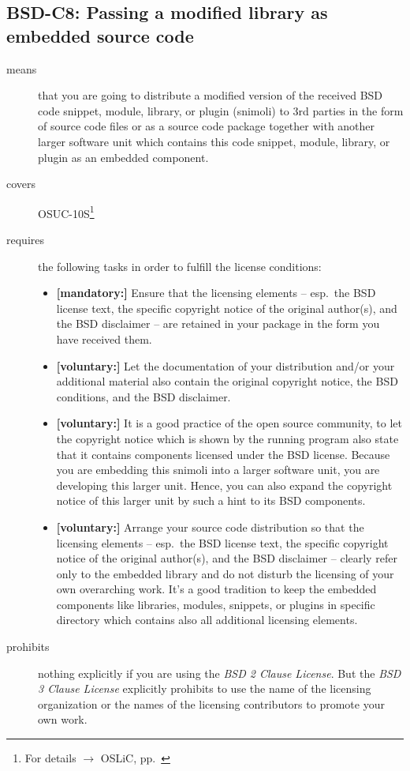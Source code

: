 \subsection{BSD-C8: Passing a modified library as embedded source code}
\label{OSUC-10S-BSD}
\begin{description}
\item[means] that you are going to distribute a modified version of the received
BSD code snippet, module, library, or plugin (snimoli) to 3rd parties in the
form of source code files or as a source code package together with another
larger software unit which contains this code snippet, module, library, or
plugin as an embedded component.
\item[covers] OSUC-10S\footnote{For details $\rightarrow$ OSLiC, pp.\
\pageref{OSUC-10S-DEF}}
\item[requires] the following tasks in order to fulfill the license conditions:
\begin{itemize}
  \item \textbf{[mandatory:]} Ensure that the licensing elements -- esp.\ the
  BSD license text, the specific copyright notice of the original author(s), and
  the BSD disclaimer -- are retained in your package in the form you have
  received them.
  \item \textbf{[voluntary:]} Let the documentation of your distribution
  and/or your additional material also contain the original copyright notice, the
  BSD conditions, and the BSD disclaimer.
 \item \textbf{[voluntary:]} It is a good practice of the open source
  community, to let the copyright notice which is shown by the running program
  also state that it contains components licensed under the BSD license. Because
  you are embedding this snimoli into a larger software unit, you are
  developing this larger unit. Hence, you can also expand the copyright notice
  of this larger unit by such a hint to its BSD components.
  
  \item \textbf{[voluntary:]} Arrange your source code distribution so that the
  licensing elements -- esp.\ the BSD license text, the specific copyright
  notice of the original author(s), and the BSD disclaimer -- clearly refer
  only to the embedded library and do not disturb the licensing of your own
  overarching work. It's a good tradition to keep the embedded components like
  libraries, modules, snippets, or plugins in specific directory which contains
  also all additional licensing elements.
  
\end{itemize}

\item[prohibits] nothing explicitly if you are using the \emph{BSD 2 Clause
License}. But the \emph{BSD 3 Clause License} explicitly prohibits to use the
name of the licensing organization or the names of the licensing contributors to
promote your own work.

\end{description}



